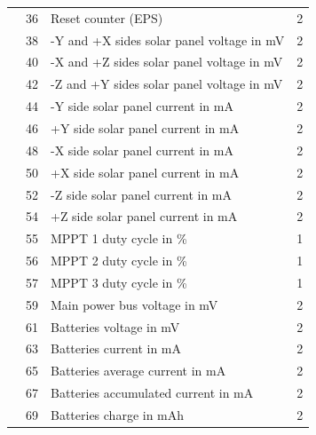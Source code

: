 \begin{longtable}[c]{lcL{0.4\textwidth}c}
                                            & 36 & Reset counter (EPS)                          & 2 \\
                                            & 38 & -Y and +X sides solar panel voltage in mV    & 2 \\
                                            & 40 & -X and +Z sides solar panel voltage in mV    & 2 \\
                                            & 42 & -Z and +Y sides solar panel voltage in mV    & 2 \\
                                            & 44 & -Y side solar panel current in mA            & 2 \\
                                            & 46 & +Y side solar panel current in mA            & 2 \\
                                            & 48 & -X side solar panel current in mA            & 2 \\
                                            & 50 & +X side solar panel current in mA            & 2 \\
                                            & 52 & -Z side solar panel current in mA            & 2 \\
                                            & 54 & +Z side solar panel current in mA            & 2 \\
                                            & 55 & MPPT 1 duty cycle in \%                      & 1 \\
                                            & 56 & MPPT 2 duty cycle in \%                      & 1 \\
                                            & 57 & MPPT 3 duty cycle in \%                      & 1 \\
                                            & 59 & Main power bus voltage in mV                 & 2 \\
                                            & 61 & Batteries voltage in mV                      & 2 \\
                                            & 63 & Batteries current in mA                      & 2 \\
                                            & 65 & Batteries average current in mA              & 2 \\
                                            & 67 & Batteries accumulated current in mA          & 2 \\
                                            & 69 & Batteries charge in mAh                      & 2 \\

\end{longtable}
